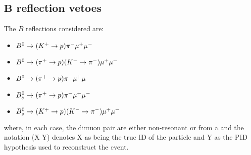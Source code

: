 \subsection[$B$ reflection vetoes]{$\mathbold{B}$ reflection vetoes}
\label{Sec:refl}
The $B$ reflections considered are:


\begin{itemize}
\item ${{B}^0}\rightarrow({{K}^+}\rightarrow{\ensuremath{p}}){{\pi}^-}{\mu^+\mu^-}$
\item ${{B}^0}\rightarrow({{\pi}^+}\rightarrow{\ensuremath{p}})({{K}^-}\rightarrow{\ensuremath{{\pi}^-}}){\mu^+\mu^-}$
\item ${{B}^0}\rightarrow({{\pi}^+}\rightarrow{\ensuremath{p}}){{\pi}^-}{\mu^+\mu^-}$
\item ${{B}^0_{s}}\rightarrow({{\pi}^+}\rightarrow{\ensuremath{p}}){{\pi}^-}{\mu^+\mu^-}$
\item ${{B}^0_{s}}\rightarrow({{K}^+}\rightarrow{\ensuremath{p}})({{K}^-}\rightarrow{\ensuremath{{\pi}^-}}){\mu^+\mu^-}$

\end{itemize}
where, in each case, the dimuon pair are either non-resonant or from a \jpsi and the notation (X \to Y) denotes X as being the true ID of the particle and Y as the PID hypothesis used to reconstruct the event.%


